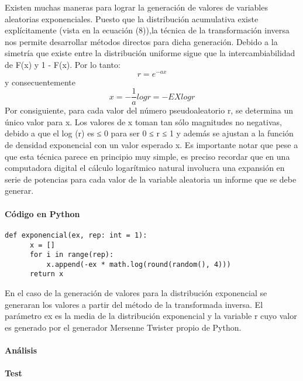 \documentclass{article}
\begin{document}
  Existen muchas maneras para lograr la generación de valores de variables aleatorias exponenciales. Puesto que la
  distribución acumulativa existe explícitamente (vista en la ecuación (8)),la técnica de la transformación inversa nos permite desarrollar métodos directos para dicha generación.
  Debido a la simetría que existe entre la distribución uniforme sigue que la intercambiabilidad de F(x) y 1 - F(x). Por lo tanto:
  \begin{equation}
    r = e^{-ax}
  \end{equation}
  y consecuentemente
  \begin{equation}
    x = -\frac{1}{a}log r  = - EXlog r
  \end{equation}
  Por consiguiente, para cada valor del número pseudoaleatorio r, se determina un único valor para x. Los valores de
  x toman tan sólo magnitudes no negativas, debido a que el log (r) es ≤ 0 para ser 0 ≤ r ≤ 1 y además se ajustan a la
  función de densidad exponencial con un valor esperado x. Es importante notar que pese a que esta técnica parece en
  principio muy simple, es preciso recordar que en una computadora digital el cálculo logarítmico natural involucra una
  expansión en serie de potencias para cada valor de la variable aleatoria un informe que se debe generar.

  \paragraph{Código en Python}
  \begin{lstlisting}[style = Python]
    def exponencial(ex, rep: int = 1):
      x = []
      for i in range(rep):
          x.append(-ex * math.log(round(random(), 4)))
      return x

  \end{lstlisting}
  En el caso de la generación de valores para la distribución exponencial se generaran los valores a partir del método de la transformada inversa. El parámetro ex es la media de la distribución exponencial y
  la variable r cuyo valor es generado por el generador Mersenne Twister propio de Python.

  \paragraph{Análisis}

  \paragraph{Test}
\end{document}
